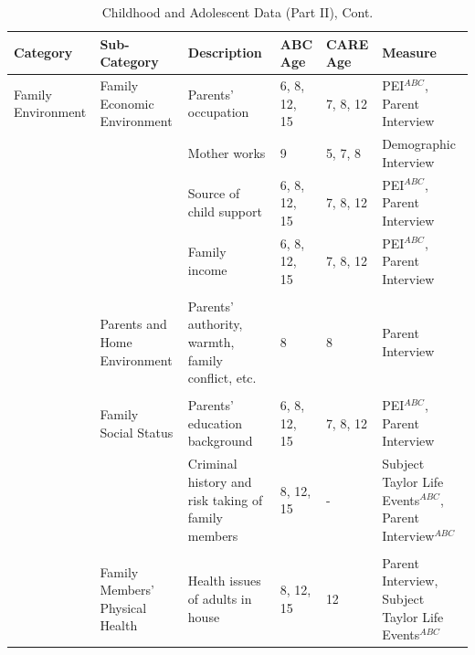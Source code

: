 \documentclass[static]{JJH-Beamer}
\begin{document}
\begin{frame}
 \addtocounter{framenumber}{-1}

\begin{table}[H]
\addtocounter{table}{-1}
\caption{Childhood and Adolescent Data (Part II), Cont.}
\begin{center}
\begin{tiny}
\begin{tabular}{L{1.2cm} C{1.4cm} C{2.5cm} C{.9cm} C{.8cm} C{2.9cm}}
\toprule
\textbf{Category}	&	\textbf{Sub-Category}	&	\textbf{Description}	&	\textbf{ABC Age}  	&  \textbf{CARE Age}  & 	\textbf{Measure}	\\ \midrule
Family Environment	&	Family Economic Environment	&	Parents' occupation	&	6, 8, 12, 15	&	7, 8, 12	&	PEI$^{ABC}$, Parent Interview	\\
		&							& Mother works & 9 & 5, 7, 8 & Demographic Interview \\
	&		&	Source of child support	&	6, 8, 12, 15	&	7, 8, 12	&	PEI$^{ABC}$, Parent Interview	\\
	&		&	Family income	&	6, 8, 12, 15	&	7, 8, 12	&	PEI$^{ABC}$, Parent Interview	\\
	&	\\
		&	Parents and Home Environment & Parents' authority, warmth, family conflict, etc. & 8 & 8 & Parent Interview \\
	&	\\
	&	Family Social Status	&	Parents' education background	&	6, 8, 12, 15	&	7, 8, 12	&	PEI$^{ABC}$, Parent Interview	\\
	&		&	Criminal history and risk taking of family members	&	8, 12, 15	&	- 	&	Subject Taylor Life Events$^{ABC}$, Parent Interview$^{ABC}$	\\
	&	\\
	&	Family Members' Physical Health	&	Health issues of adults in house	&	8, 12, 15	&	12	&	Parent Interview, Subject Taylor Life Events$^{ABC}$	\\
\bottomrule
\end{tabular}
\end{tiny}
\end{center}
\end{table}

\end{frame}
\end{document}
